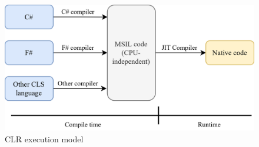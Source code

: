\begin{figure}[htb]
	\centering
		\includegraphics[scale=1.0]{figures02/clr.png}
	\caption{CLR execution model}
	\label{fig:clr}
\end{figure}


